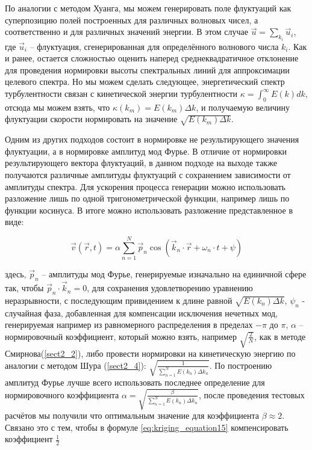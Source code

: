 По аналогии с методом Хуанга, мы можем генерировать поле флуктуаций как суперпозицию полей построенных для различных волновых чисел, а соответственно и для различных значений энергии. В этом случае $\vec u = \sum_{k_{i}} \vec u_i$, где $\vec u_i$ -- флуктуация, сгенерированная для определённого волнового числа $k_i$. Как и ранее, остается сложностью оценить наперед среднеквадратичное отклонение для проведения нормировки высоты спектральных линий для аппроксимации целевого спектра. Но мы можем сделать следующее, энергетический спектр турбулентности связан с кинетической энергии турбулентности $\kappa = \int_{0}^{\infty} E(k) dk$, отсюда мы можем взять, что $\kappa(k_m) = E(k_m) \Delta k$, и получаемую величину флуктуации скорости нормировать на значение $\sqrt{E(k_m) \Delta k}$. 

Одним из других подходов состоит в нормировке не результирующего значения флуктуации, а в нормировке амплитуд мод Фурье. В отличие от нормировки результирующего вектора флуктуаций, в данном подходе на выходе также получаются различные амплитуды флуктуаций с сохранением зависимости от амплитуды спектра. Для ускорения процесса генерации можно использовать разложение лишь по одной тригонометрической функции, например лишь по функции косинуса. В итоге можно использовать разложение представленное в виде:

\begin{equation}
    \label{eq:part3_3}
    \vec v(\vec r, t) = \alpha \sum_{n = 1}^{N} \vec p_n \cos( \vec k_n \cdot \vec r + \omega_n \cdot t + \psi)  
\end{equation}

\noindent здесь, $\vec p_n$ -- амплитуды мод Фурье, генерируемые изначально на единичной сфере так, чтобы $\vec p_n \cdot \vec k_n = 0$, для сохранения удовлетворению уравнению неразрывности, с последующим привидением к длине равной $\sqrt{E(k_n)\Delta k}$, $\psi_n$ - случайная фаза, добавленная для компенсации исключения нечетных мод, генерируемая например из равномерного распределения в пределах $-\pi$ до $\pi$, $\alpha$ -- нормировочный коэффициент, который можно взять, например $\sqrt{\frac{2}{N}}$, как в методе Смирнова(\ref{sect2_2}), либо провести нормировки на кинетическую энергию по аналогии с методом Шура (\ref{sect2_4}): $\sqrt{\frac{1}{\sum_{n=1}^{N} E(k_n) \Delta k_n}}$. По построению амплитуд Фурье лучше всего использовать последнее определение для нормировочного коэффициента $\alpha = \sqrt{\frac{\beta}{\sum_{n=1}^{N} E(k_n) \Delta k_n}}$, после проведения тестовых расчётов мы получили что оптимальным значение для коэффициента $\beta \approx 2$. Связано это с тем, чтобы в формуле \eqref{eq:kriging_equation15} компенсировать коэффициент $\frac{1}{2}$

